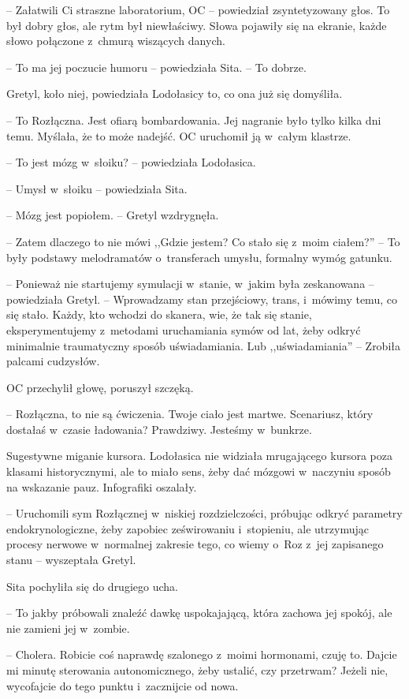 \documentclass[oneside,polish,11pt,sfheadings]{mwbk}
\begin{document}
-- Załatwili Ci straszne laboratorium, OC -- powiedział zsyntetyzowany
głos. To był dobry głos, ale rytm był niewłaściwy. Słowa pojawiły się na
ekranie, każde słowo połączone z~chmurą wiszących danych.

-- To ma jej poczucie humoru -- powiedziała Sita. -- To dobrze.

Gretyl, koło niej, powiedziała Lodołasicy to, co ona już się domyśliła.

-- To Rozłączna. Jest ofiarą bombardowania. Jej nagranie było tylko kilka
dni temu. Myślała, że to może nadejść. OC uruchomił ją w~całym klastrze.

-- To jest mózg w~słoiku? -- powiedziała Lodołasica.

-- Umysł w~słoiku -- powiedziała Sita.

-- Mózg jest popiołem. -- Gretyl wzdrygnęła.

-- Zatem dlaczego to nie mówi ,,Gdzie jestem? Co stało się z~moim
ciałem?'' -- To były podstawy melodramatów o~transferach umysłu, formalny
wymóg gatunku.

-- Ponieważ nie startujemy symulacji w~stanie, w~jakim była zeskanowana -- powiedziała Gretyl. -- Wprowadzamy stan przejściowy, trans, i~mówimy temu,
co się stało. Każdy, kto wchodzi do skanera, wie, że tak się stanie,
eksperymentujemy z~metodami uruchamiania symów od lat, żeby odkryć
minimalnie traumatyczny sposób uświadamiania. Lub ,,uświadamiania'' -- Zrobiła palcami cudzysłów.

OC przechylił głowę, poruszył szczęką. 

-- Rozłączna, to nie są ćwiczenia.
Twoje ciało jest martwe. Scenariusz, który dostałaś w~czasie ładowania?
Prawdziwy. Jesteśmy w~bunkrze.

Sugestywne miganie kursora. Lodołasica nie widziała mrugającego kursora
poza klasami historycznymi, ale to miało sens, żeby dać mózgowi w~naczyniu sposób na wskazanie pauz. Infografiki oszalały.

-- Uruchomili sym Rozłącznej w~niskiej rozdzielczości, próbując odkryć
parametry endokrynologiczne, żeby zapobiec ześwirowaniu i~stopieniu, ale
utrzymując procesy nerwowe w~normalnej zakresie tego, co wiemy o~Roz z~jej zapisanego stanu -- wyszeptała Gretyl.

Sita pochyliła się do drugiego ucha. 

-- To jakby próbowali znaleźć dawkę
uspokajającą, która zachowa jej spokój, ale nie zamieni jej w~zombie.

-- Cholera. Robicie coś naprawdę szalonego z~moimi hormonami, czuję to.
Dajcie mi minutę sterowania autonomicznego, żeby ustalić, czy przetrwam?
Jeżeli nie, wycofajcie do tego punktu i~zacznijcie od nowa.
\end{document}

